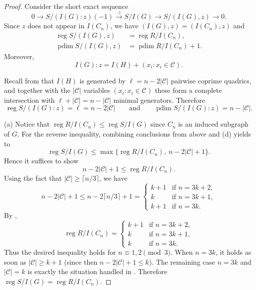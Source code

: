 \documentclass[12pt]{amsart}
\theoremstyle{plain}
\theoremstyle{definition}
\DeclareMathOperator{\reg}{reg}
\DeclareMathOperator{\pdim}{pdim}
\begin{document}
\begin{proof}
Consider the short exact sequence
\[
0 \longrightarrow S/(I(G):z)(-1)\xrightarrow{\cdot z} S/I(G)
\longrightarrow S/(I(G),z)\longrightarrow 0.
\]
Since $z$ does not appear in $I(C_n)$, we have $(I(G),z)=(I(C_n),z)$ and
\begin{align*}
  \reg S/(I(G),z) &=\reg R/I(C_n),\\ 
\pdim S/(I(G),z)&=\pdim R/I(C_n)+1.  
\end{align*}
Moreover,
\[
I(G):z = I(H)+(x_i:x_i\in\mathcal{C}).
\]

Recall from  that  $I(H)$ is generated by $\ell=n-2|\mathcal{C}|$
pairwise coprime quadrics, and together with the $|\mathcal{C}|$ variables $(x_i:x_i\in\mathcal{C})$
these form a complete intersection with $\ell+|\mathcal{C}|=n-|\mathcal{C}|$ minimal generators. Therefore
\[
\reg S/(I(G):z)=\ell=n-2|\mathcal{C}|
\qquad\text{and}\qquad
\pdim S/(I(G):z)=n-|\mathcal{C}|.
\]

\textup{(a)} Notice that
$\reg R/I(C_n) \le \reg S/I(G)$ since $C_n$ is an induced subgraph of $G$. For the reverse inequality, combining conclusions from above and  (d) yields to
\[
\reg S/I(G)\le  \max\{\reg R/I(C_n),\ n-2|\mathcal{C}|+1\}.
\]
 Hence it suffices to show
\[
n-2|\mathcal{C}|+1 \le \reg R/I(C_n).
\]
Using the fact that $|\mathcal{C}|\ge \lceil n/3\rceil$, we have
\[
n-2|\mathcal{C}|+1 \le n-2\lceil n/3\rceil+1=
\begin{cases}
k+1 &\text{if }n=3k+2,\\
k   &\text{if }n=3k+1,\\
k+1 &\text{if }n=3k.
\end{cases}
\]
By \cite[Theorem~5.2]{Selvi_cycles},
\[
\reg R/I(C_n)=
\begin{cases}
k+1 &\text{if }n=3k+2,\\
k   &\text{if }n=3k+1,\\
k   &\text{if }n=3k.
\end{cases}
\]
Thus the desired inequality holds for $n\equiv 1,2\pmod 3$. When $n=3k$, it holds as soon as
$|\mathcal{C}|\ge k+1$ (since then $n-2|\mathcal{C}|+1\le k$). The remaining case
$n=3k$ and $|\mathcal{C}|=k$ is exactly the situation handled in .
Therefore $\reg S/I(G)=\reg R/I(C_n)$.


\end{proof}
\end{document}
